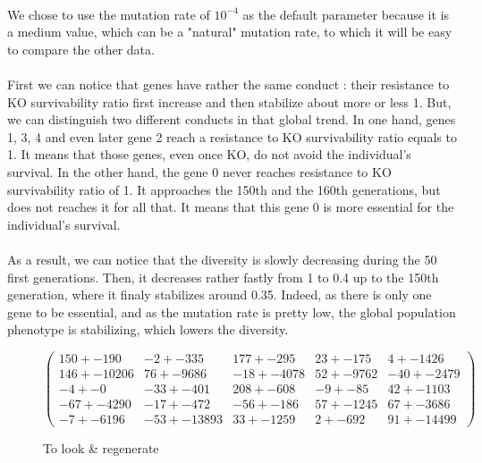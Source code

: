 \documentclass[]{report} %
\begin{document}
    \paragraph*{}
    We chose to use the mutation rate of $10^{-4}$ as the default parameter because it is a medium value, which can be a "natural" mutation rate, to which it will be easy to compare the other data.
    \paragraph*{}
    First we can notice that genes have rather the same conduct : their resistance to KO survivability ratio first increase and then stabilize about more or less 1. But, we can distinguish two different conducts in that global trend. In one hand, genes 1, 3, 4 and even later gene 2 reach a resistance to KO survivability ratio equals to 1. It means that those genes, even once KO, do not avoid the individual's survival. In the other hand, the gene 0 never reaches resistance to KO survivability ratio of 1. It approaches the 150th and the 160th generations, but does not reaches it for all that. It means that this gene 0 is more essential for the individual's survival.
    \paragraph*{}
    As a result, we can notice that the diversity is slowly decreasing during the 50 first generations. Then, it decreases rather fastly from 1 to 0.4 up to the 150th generation, where it finaly stabilizes around 0.35. Indeed, as there is only one gene to be essential, and as the mutation rate is pretty low, the global population phenotype is stabilizing, which lowers the diversity.

    \begin{figure}[H] 
            \centering
            \small
    $
            \begin{pmatrix}
                150 +- 190 & -2 +- 335 & 177 +- 295 & 23 +- 175 & 4 +- 1426 \\
                146 +- 10206 & 76 +- 9686 & -18 +- 4078 & 52 +- 9762 & -40 +- 2479 \\
                -4 +- 0 & -33 +- 401 & 208 +- 608 & -9 +- 85 & 42 +- 1103 \\
                -67 +- 4290 & -17 +- 472 & -56 +- 186 & 57 +- 1245 & 67 +- 3686 \\
                -7 +- 6196 & -53 +- 13893 & 33 +- 1259 & 2 +- 692 & 91 +- 1449 9 
            \end{pmatrix}
    $
            \caption{To look \& regenerate}
            \label{mat:ps300xg200xmr1-10-4}
    \end{figure}
    
\end{document}
